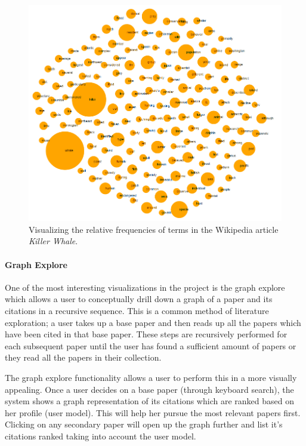 \begin{figure}[htb]\centering 
\includegraphics[width=.5\textwidth]{images/doc_tf_bubble_chart.png}
\caption{Visualizing the relative frequencies of terms in the 
Wikipedia article \textit{Killer Whale}. }
\label{fig:doc-word-counts}
\end{figure}

\paragraph{Graph Explore}
One of the most interesting visualizations in the project is the graph explore which allows a user to conceptually drill down a graph of a paper and its citations in a recursive sequence.
This is a common method of literature exploration; a user takes up a base paper and then reads up all the papers which have been cited in that base paper.
These steps are recursively performed for each subsequent paper until the user has found a sufficient amount of papers or they read all the papers in their collection.

The graph explore functionality allows a user to perform this in a more visually appealing.
Once a user decides on a base paper (through keyboard search), the system shows a graph representation of its citations which are ranked based on her profile (user model).
This will help her pursue the most relevant papers first.
Clicking on any secondary paper will open up the graph further and list it's citations ranked taking into account the user model.
